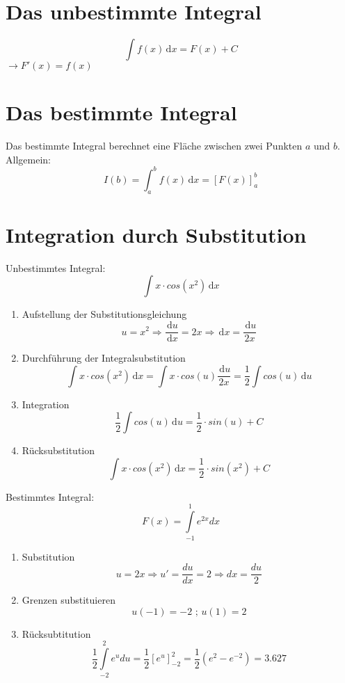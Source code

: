 \section{Das unbestimmte Integral} %
\label{sec:das_unbestimmte_integral}
\[ \int f(x)\,\mathrm{d}x = F(x) + C \] \(\rightarrow F'(x) = f(x) \)

\section{Das bestimmte Integral} %
\label{sub:das_bestimmte_integral}
Das bestimmte Integral berechnet eine Fläche zwischen zwei Punkten $a$ und $b$.\newline
Allgemein:
\[ I(b) = \int_a^b f(x) \,\mathrm{d}x = [F(x)]_a^b \]

\section{Integration durch Substitution} %
\begin{bsp}Unbestimmtes Integral:
\[ \int x \cdot cos(x^2)\,\mathrm{d}x\]
\begin{enumerate}
	\item Aufstellung der Substitutionsgleichung
	\[u = x^2 \Rightarrow \frac{\,\mathrm{d}u}{\,\mathrm{d}x} = 2x \Rightarrow \,\mathrm{d}x = \frac{\,\mathrm{d}u}{2x} \]
	\item Durchführung der Integralsubstitution
	\[\int x \cdot cos(x^2)\,\mathrm{d}x = \int x \cdot cos(u) \frac{\,\mathrm{d}u}{2x} = \frac{1}{2} \int cos(u)\,\mathrm{d}u \]
	\item Integration
	\[\frac{1}{2} \int cos(u)\,\mathrm{d}u = \frac{1}{2} \cdot sin(u) + C\]
	\item Rücksubstitution
	\[ \int x \cdot cos(x^2)\,\mathrm{d}x = \frac{1}{2} \cdot sin(x^2) + C\]
\end{enumerate}
\end{bsp}

\begin{bsp}Bestimmtes Integral:
$$F(x) = \int\limits_{-1}^1 e^{2x} dx$$
\begin{enumerate}
\item Substitution
$$ u = 2x \Rightarrow u' = \frac{du}{dx} = 2 \Rightarrow dx = \frac{du}{2}$$
\item Grenzen substituieren
$$ u(-1) = -2 \text{ ; } 
u(1) = 2$$
\item Rücksubtitution
$$\frac{1}{2} \int\limits_{-2}^2 e^u du = \frac{1}{2} [e^u]_{-2}^2 = \frac{1}{2}(e^2 - e^{-2}) = 3.627$$
\end{enumerate}
\end{bsp}



